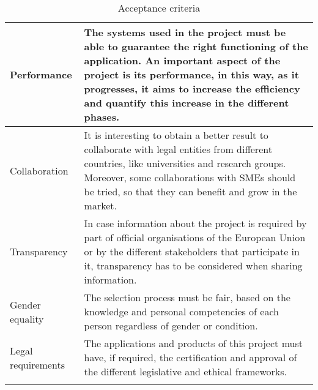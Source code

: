 \begin{longtable}[H]{lp{10.2cm}}
	\midrule
	
	Performance & The systems used in the project must be able to guarantee the right functioning of the application. An important aspect of the project is its performance, in this way, as it progresses, it aims to increase the efficiency and quantify this increase in the different phases.\vspace{0.2cm} \\
	
	\midrule
	
	Collaboration & It is interesting to obtain a better result to collaborate with legal entities from different countries, like universities and research groups. Moreover, some collaborations with SMEs should be tried, so that they can benefit and grow in the market.\vspace{0.2cm} \\
	
	\midrule
	
	Transparency & In case information about the project is required by part of official organisations of the European Union or by the different stakeholders that participate in it, transparency has to be considered when sharing information.\vspace{0.2cm} \\
	
	\midrule
	
	Gender equality & The selection process must be fair, based on the knowledge and personal competencies of each person regardless of gender or condition.\vspace{0.2cm} \\
	
	\midrule
	
	Legal requirements & The applications and products of this project must have, if required, the certification and approval of the different legislative and ethical frameworks.\vspace{0.2cm} \\
	
	\bottomrule[2pt]
	
	\caption{Acceptance criteria}
\end{longtable}